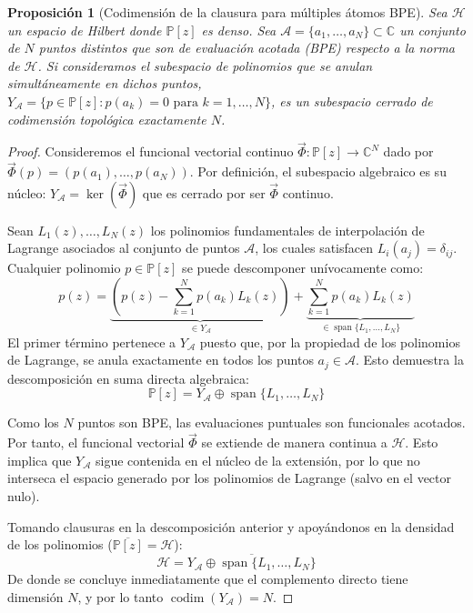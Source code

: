 \documentclass[12pt,a4paper]{article}
\newtheorem{proposicion}{Proposición}
\theoremstyle{definition}
\theoremstyle{remark}
\begin{document}
\begin{proposicion}[Codimensión de la clausura para múltiples átomos BPE]
    Sea $\mathcal{H}$ un espacio de Hilbert donde $\mathbb{P}[z]$ es denso. Sea $\mathcal{A} = \{a_1, \dots, a_N\} \subset \mathbb{C}$ un conjunto de $N$ puntos distintos que son de evaluación acotada (BPE) respecto a la norma de $\mathcal{H}$. Si consideramos el subespacio de polinomios que se anulan simultáneamente en dichos puntos, $Y_{\mathcal{A}} = \{p \in \mathbb{P}[z] : p(a_k) = 0 \text{ para } k=1,\dots,N\}$, es un subespacio cerrado de codimensión topológica exactamente $N$.
\end{proposicion}

\begin{proof}
    Consideremos el funcional vectorial continuo $\vec{\Phi}: \mathbb{P}[z] \to \mathbb{C}^N$ dado por $\vec{\Phi}(p) = (p(a_1), \dots, p(a_N))$. Por definición, el subespacio algebraico es su núcleo: $Y_{\mathcal{A}} = \ker(\vec{\Phi})$ que es cerrado por ser $\vec{\Phi}$ continuo.

    Sean $L_1(z), \dots, L_N(z)$ los polinomios fundamentales de interpolación de Lagrange asociados al conjunto de puntos $\mathcal{A}$, los cuales satisfacen $L_i(a_j) = \delta_{ij}$. Cualquier polinomio $p \in \mathbb{P}[z]$ se puede descomponer unívocamente como:
    $$p(z) = \underbrace{\left( p(z) - \sum_{k=1}^N p(a_k)L_k(z) \right)}_{\in Y_{\mathcal{A}}} + \underbrace{\sum_{k=1}^N p(a_k)L_k(z)}_{\in \operatorname{span}\{L_1, \dots, L_N\}}$$
    El primer término pertenece a $Y_{\mathcal{A}}$ puesto que, por la propiedad de los polinomios de Lagrange, se anula exactamente en todos los puntos $a_j \in \mathcal{A}$. Esto demuestra la descomposición en suma directa algebraica:
    $$\mathbb{P}[z] = Y_{\mathcal{A}} \oplus \operatorname{span}\{L_1, \dots, L_N\}$$

    Como los $N$ puntos son BPE, las evaluaciones puntuales son funcionales acotados. Por tanto, el funcional vectorial $\vec{\Phi}$ se extiende de manera continua a $\mathcal{H}$. Esto implica que  $Y_{\mathcal{A}}$ sigue contenida en el núcleo de la extensión, por lo que no interseca el espacio generado por los polinomios de Lagrange (salvo en el vector nulo).

    Tomando clausuras en la descomposición anterior y apoyándonos en la densidad de los polinomios ($\overline{\mathbb{P}[z]} = \mathcal{H}$):
    $$\mathcal{H} = \overline{Y_{\mathcal{A}} \oplus \operatorname{span}\{L_1, \dots, L_N\}}$$
    De donde se concluye inmediatamente que el complemento directo tiene dimensión $N$, y por lo tanto $\operatorname{codim}(Y_{\mathcal{A}}) = N$.
\end{proof}
\end{document}

